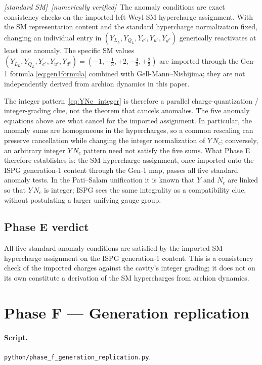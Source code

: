 \documentclass[11pt]{article}
\newcommand{\fromSM}{\textit{[standard SM]}}
\newcommand{\numerical}{\textit{[numerically verified]}}
\begin{document}
\fromSM\ \numerical\ The anomaly conditions are exact
consistency checks on the imported left-Weyl SM hypercharge
assignment. With the SM representation content and the standard
hypercharge normalization fixed, changing an individual entry in
$(Y_{L_L},Y_{Q_L},Y_{e^c},Y_{u^c},Y_{d^c})$ generically
reactivates at least one anomaly. The specific SM values
$(Y_{L_L},Y_{Q_L},Y_{e^c},Y_{u^c},Y_{d^c})
=(-1,+\tfrac13,+2,-\tfrac43,+\tfrac23)$ are imported through
the Gen-1 formula \eqref{eq:gen1formula} combined with
Gell-Mann--Nishijima; they are not independently derived from
archion dynamics in this paper.

The integer pattern~\eqref{eq:YNc_integer} is therefore a
parallel charge-quantization / integer-grading clue, not the
theorem that cancels anomalies. The five anomaly equations above
are what cancel for the imported assignment. In particular,
the anomaly sums are homogeneous in the hypercharges, so a common
rescaling can preserve cancellation while changing the integer
normalization of $Y\,N_c$; conversely, an arbitrary integer
$Y\,N_c$ pattern need not satisfy the five sums. What Phase E
therefore establishes is: the SM hypercharge assignment, once
imported onto the ISPG generation-1 content through the Gen-1
map, passes all five standard anomaly tests. In the Pati--Salam
unification it is known that $Y$ and $N_c$ are linked so that
$Y\,N_c$ is integer; ISPG sees the same integrality as a
compatibility clue, without postulating a larger unifying gauge
group.

\subsection{Phase E verdict}

All five standard anomaly conditions are satisfied by the
imported SM hypercharge assignment on the ISPG generation-1
content. This is a consistency check of the imported charges
against the cavity's integer grading; it does not on its own
constitute a derivation of the SM hypercharges from archion
dynamics.

\section{Phase F --- Generation replication}
\label{sec:phaseF}

\paragraph{Script.} \texttt{python/phase\_f\_generation\_replication.py}.
\end{document}
